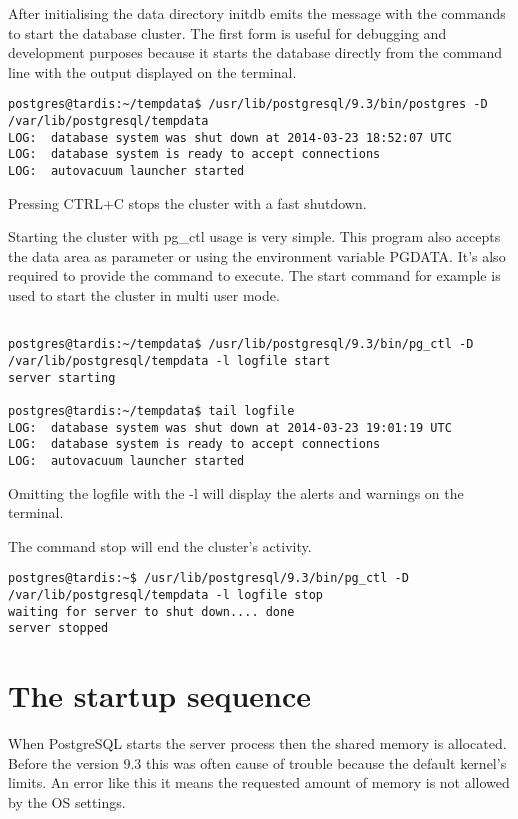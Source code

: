 After initialising the data directory initdb emits the message with the commands to start the 
database cluster. The first form is useful for debugging and development purposes because it starts 
the database directly from the command line with the output displayed on the terminal. 

\begin{verbatim}
postgres@tardis:~/tempdata$ /usr/lib/postgresql/9.3/bin/postgres -D 
/var/lib/postgresql/tempdata
LOG:  database system was shut down at 2014-03-23 18:52:07 UTC
LOG:  database system is ready to accept connections
LOG:  autovacuum launcher started

\end{verbatim}

Pressing CTRL+C stops the cluster with a fast shutdown.\newline

Starting the cluster with pg\_ctl usage is very simple. This program also accepts the data area as 
parameter or using the environment variable PGDATA. It's also required to provide the command to 
execute. The start command for example is used to start the cluster in multi user mode.

\begin{verbatim}

postgres@tardis:~/tempdata$ /usr/lib/postgresql/9.3/bin/pg_ctl -D 
/var/lib/postgresql/tempdata -l logfile start
server starting

postgres@tardis:~/tempdata$ tail logfile 
LOG:  database system was shut down at 2014-03-23 19:01:19 UTC
LOG:  database system is ready to accept connections
LOG:  autovacuum launcher started

\end{verbatim}
Omitting the logfile with the -l will display the alerts and warnings on the terminal.

The command stop will end the cluster's activity.

\begin{verbatim}
postgres@tardis:~$ /usr/lib/postgresql/9.3/bin/pg_ctl -D 
/var/lib/postgresql/tempdata -l logfile stop
waiting for server to shut down.... done
server stopped
\end{verbatim}

\section{The startup sequence}
\label{sec:STARTUP}

When PostgreSQL starts the server process then the shared memory is allocated. Before the version
9.3 this was often cause of trouble because the default kernel's limits. An error like this it
means the requested amount of memory is not allowed by the OS settings.

